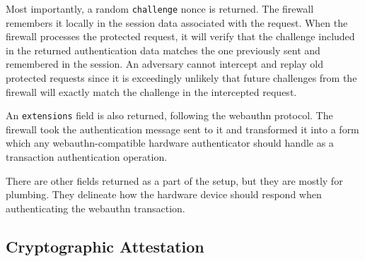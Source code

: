 
\iffalse
\begin{lstlisting}
type PublicKeyCredentialRequestOptions struct {
	Challenge          Challenge                   
	Timeout            int                         
	RelyingPartyID     string                      
	AllowedCredentials []CredentialDescriptor      
	UserVerification   UserVerificationRequirement 
	Extensions         AuthenticationExtensions    
}
\end{lstlisting}
\fi

Most importantly, a random \lstinline{challenge} nonce is returned. The firewall remembers it locally in the session data associated with the request. When the firewall processes the protected request, it will verify that the challenge included in the returned authentication data matches the one previously sent and remembered in the session. An adversary cannot intercept and replay old protected requests since it is exceedingly unlikely that future challenges from the firewall will exactly match the challenge in the intercepted request. 

An \lstinline{extensions} field is also returned, following the webauthn protocol. The firewall took the authentication message sent to it and transformed it into a form which any webauthn-compatible hardware authenticator should handle as a transaction authentication operation.

There are other fields returned as a part of the setup, but they are mostly for plumbing. They delineate how the hardware device should respond when authenticating the webauthn transaction.

\iffalse
The other fields are mostly for plumbing. The \lstinline{Timeout} requires an authentication response with that amount of time. The \lstinline{RelyingPartyID} identifies the backend. The \lstinline{AllowedCredentials} identifies with which cryptographic key the user can sign the response. The \lstinline{UserVerification} tells the hardware authenticator that the user must physically confirm ``yes'' or deny ``no'' a request and is usually set to \lstinline{true}. The \lstinline{Extensions} includes a signal that transaction authentication is to be performed with the authentication message sent to the firewall.
\fi

\subsection{Cryptographic Attestation}

